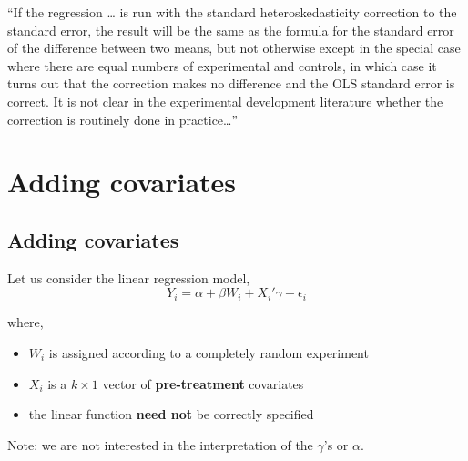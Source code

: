 \documentclass[
  letterpaper,
  DIV=11,
  numbers=noendperiod]{scrreprt}
\providecommand{\tightlist}{%
  \setlength{\itemsep}{0pt}\setlength{\parskip}{0pt}}\usepackage{longtable,booktabs,array}
\theoremstyle{definition}
\theoremstyle{remark}
\begin{document}
\begin{tcolorbox}[enhanced jigsaw, breakable, colframe=quarto-callout-tip-color-frame, toptitle=1mm, toprule=.15mm, opacitybacktitle=0.6, opacityback=0, rightrule=.15mm, titlerule=0mm, colback=white, bottomtitle=1mm, title={Deaton (2010, p.442)}, arc=.35mm, coltitle=black, colbacktitle=quarto-callout-tip-color!10!white, leftrule=.75mm, bottomrule=.15mm, left=2mm]

``If the regression \ldots{} is run with the standard heteroskedasticity
correction to the standard error, the result will be the same as the
formula for the standard error of the difference between two means, but
not otherwise except in the special case where there are equal numbers
of experimental and controls, in which case it turns out that the
correction makes no difference and the OLS standard error is correct. It
is not clear in the experimental development literature whether the
correction is routinely done in practice\ldots{}''

\end{tcolorbox}

\hypertarget{adding-covariates}{%
\section{Adding covariates}\label{adding-covariates}}

\hypertarget{adding-covariates-1}{%
\subsection{Adding covariates}\label{adding-covariates-1}}

Let us consider the linear regression model, \[
            Y_i = \alpha+\beta W_i + X_i'\gamma+\epsilon_i
\]

where,

\par

\begin{itemize}
\tightlist
\item
  \(W_i\) is assigned according to a completely random experiment
\item
  \(X_i\) is a \(k\times 1\) vector of \textbf{pre-treatment} covariates
\item
  the linear function \textbf{need not} be correctly specified
\end{itemize}

Note: we are not interested in the interpretation of the \(\gamma\)'s or
\(\alpha\).
\end{document}
